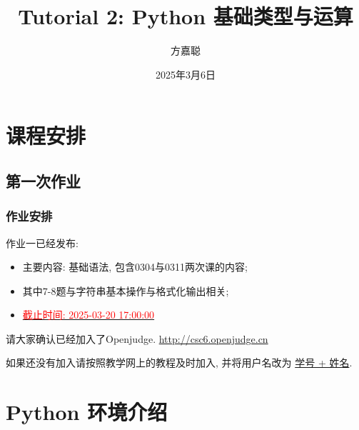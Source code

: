 \documentclass{ctexbeamer}
\title{Tutorial 2: Python 基础类型与运算}
\author{方嘉聪}
\institute{jiacong\_fang@stu.pku.edu.cn}
\date{2025年3月6日}
\begin{document}
    \begin{frame}
        \titlepage
    \end{frame}

    \section{课程安排}
    \subsection{第一次作业}
    \begin{frame}[fragile]  
        \frametitle{作业安排}     
        作业一已经发布: 
        \begin{itemize}
            \item 主要内容: 基础语法, 包含0304与0311两次课的内容;
            \item 其中7-8题与字符串基本操作与格式化输出相关;
            \item \underline{\textcolor{red}{截止时间: 2025-03-20 17:00:00}}
        \end{itemize}
        \vspace{2em}
        请大家确认已经加入了Openjudge. \href{http://csc6.openjudge.cn}{http://csc6.openjudge.cn}
        \vspace{1em}
        
        如果还没有加入请按照教学网上的教程及时加入, 并将用户名改为 \underline{学号 + 姓名}.
    \end{frame}

    \section{Python 环境介绍}
\end{document}
